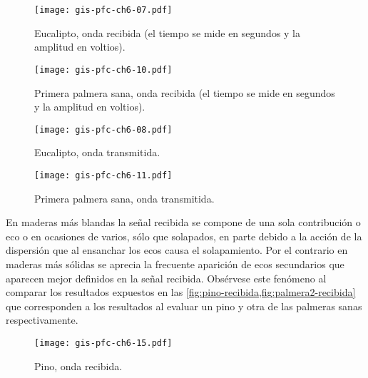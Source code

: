 \begin{figure}[p]
    \begin{center}
	\texttt{[image: gis-pfc-ch6-07.pdf]}
    \end{center}
    \caption[Eucalipto (onda recibida)]{Eucalipto, onda recibida (el tiempo
    se mide en segundos y la amplitud en voltios).}
    \label{fig:eucalipto}
\end{figure}

\begin{figure}[p]
    \begin{center}
	\texttt{[image: gis-pfc-ch6-10.pdf]}
    \end{center}
    \caption[Primera palmera sana (onda recibida)]{Primera palmera sana,
    onda recibida (el tiempo se mide en segundos y la amplitud en
    voltios).}
    \label{fig:palmera1}
\end{figure}

\begin{figure}[p]
    \begin{center}
	\texttt{[image: gis-pfc-ch6-08.pdf]}
    \end{center}
    \caption[Eucalipto (onda transmitida)]{Eucalipto, onda transmitida.}
    \label{fig:eucalipto-transmitida}
\end{figure}

\begin{figure}[p]
    \begin{center}
	\texttt{[image: gis-pfc-ch6-11.pdf]}
    \end{center}
    \caption[Primera palmera sana (onda transmitida)]{Primera palmera sana,
    onda transmitida.}
    \label{fig:palmera1-transmitida}
\end{figure}

En maderas más blandas la señal recibida se compone de una sola
contribución o eco o en ocasiones de varios, sólo que solapados, en parte
debido a la acción de la dispersión que al ensanchar los ecos causa el
solapamiento. Por el contrario en maderas más sólidas se aprecia la
frecuente aparición de ecos secundarios que aparecen mejor definidos en la
señal recibida. Obsérvese este fenómeno al comparar los resultados
expuestos en las \cref{fig:pino-recibida,fig:palmera2-recibida} que
corresponden a los resultados al evaluar un pino y otra de las palmeras
sanas respectivamente.

\begin{figure}[p]
    \begin{center}
	\texttt{[image: gis-pfc-ch6-15.pdf]}
    \end{center}
    \caption[Pino (onda recibida)]{Pino, onda recibida.}
    \label{fig:pino-recibida}
\end{figure}

